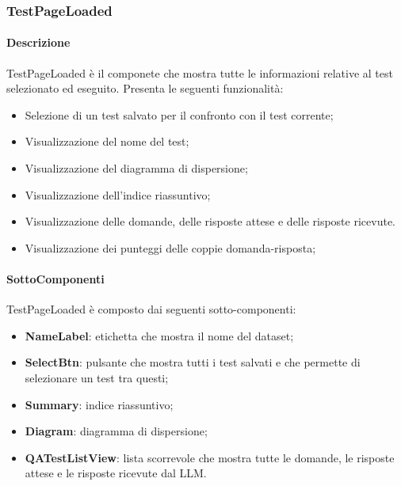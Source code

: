 \subsubsection{TestPageLoaded}
\label{sec:TestPageLoaded}
\paragraph{Descrizione}
TestPageLoaded è il componete che mostra tutte le informazioni relative al test selezionato ed eseguito. Presenta le seguenti funzionalità:
\begin{itemize}
    \item Selezione di un test salvato per il confronto con il test corrente; 
    \item Visualizzazione del nome del test;
    \item Visualizzazione del diagramma di dispersione;
    \item Visualizzazione dell'indice riassuntivo;
    \item Visualizzazione delle domande, delle risposte attese e delle risposte ricevute.
    \item Visualizzazione dei punteggi delle coppie domanda-risposta;
\end{itemize}
\paragraph{SottoComponenti}
TestPageLoaded è composto dai seguenti sotto-componenti:
\begin{itemize}
    \item \textbf{NameLabel}: etichetta che mostra il nome del dataset;
    \item \textbf{SelectBtn}: pulsante che mostra tutti i test salvati e che permette di selezionare un test tra questi;
    \item \textbf{Summary}: indice riassuntivo;
    \item \textbf{Diagram}: diagramma di dispersione;
    \item \textbf{QATestListView}: lista scorrevole che mostra tutte le domande, le risposte attese e le risposte ricevute dal LLM.
\end{itemize}

